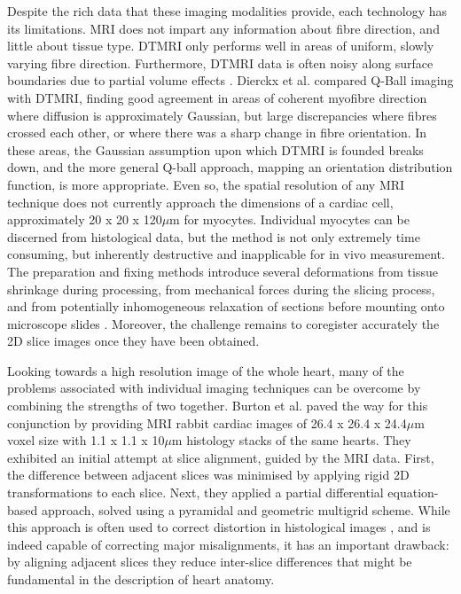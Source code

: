     Despite the rich data that these imaging modalities provide, each technology has its limitations. MRI does not impart any information about fibre direction, and little about tissue type. DTMRI only performs well in areas of uniform, slowly varying fibre direction. Furthermore, DTMRI data is often noisy along surface boundaries due to partial volume effects \cite{Alexander2001}. Dierckx et al. \cite{Dierckx2009} compared Q-Ball imaging with DTMRI, finding good agreement in areas of coherent myofibre direction where diffusion is approximately Gaussian, but large discrepancies where fibres crossed each other, or where there was a sharp change in fibre orientation. In these areas, the Gaussian assumption upon which DTMRI is founded breaks down, and the more general Q-ball approach, mapping an orientation distribution function, is more appropriate. Even so, the spatial resolution of any MRI technique does not currently approach the dimensions of a cardiac cell, approximately 20 x 20 x 120$\mu$m for myocytes. Individual myocytes can be discerned from histological data, but the method is not only extremely time consuming, but inherently destructive and  inapplicable for in vivo measurement. The preparation and fixing methods introduce several deformations from tissue shrinkage during processing, from mechanical forces during the slicing process, and from potentially inhomogeneous relaxation of sections before mounting onto microscope slides \cite{Burton2006}. Moreover, the challenge remains to coregister accurately the 2D slice images once they have been obtained.
    
    Looking towards a high resolution image of the whole heart, many of the problems associated with individual imaging techniques can be overcome by combining the strengths of two together. Burton et al. paved the way for this conjunction by providing \cite{Burton2006} MRI rabbit cardiac images of 26.4 x 26.4 x 24.4$\mu$m voxel size with 1.1 x 1.1 x 10$\mu$m histology stacks of the same hearts. They exhibited an initial attempt at slice alignment, guided by the MRI data. First, the difference between adjacent slices was minimised by applying rigid 2D transformations to each slice. Next, they applied a partial differential equation-based approach, solved using a pyramidal and geometric multigrid scheme. While this approach is often used to correct distortion in histological images \cite{Keeling2005}, and is indeed capable of correcting major misalignments, it has an important drawback: by aligning adjacent slices they reduce inter-slice differences that might be fundamental in the description of heart anatomy.
  
